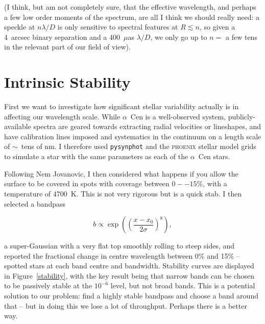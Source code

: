 \documentclass[a4paper,12pt]{article}
\begin{document}
(I think, but am not completely sure, that the effective wavelength, and perhaps a few low order moments of the spectrum, are all I think we should really need: a speckle at $n \lambda/D$ is only sensitive to spectral features at $R\lesssim n$, so given a 4~arcsec binary separation and a 400~$\mu$as $\lambda/D$, we only go up to $n =$ a few tens in the relevant part of our field of view).

\section{Intrinsic Stability}

First we want to investigate how significant stellar variability actually is in affecting our wavelength scale. While $\alpha$~Cen is a well-observed system, publicly-available spectra are geared towards extracting radial velocities or lineshapes, and have calibration lines imposed and systematics in the continuum on a length scale of $\sim$~tens of nm. I therefore used \texttt{pysynphot} and the \textsc{phoenix} stellar model grids to simulate a star with the same parameters as each of the $\alpha$~Cen stars.

Following Nem Jovanovic, I then considered what happens if you allow the surface to be covered in spots with coverage between $0 -- 15\%$, with a temperature of 4700~K. This is not very rigorous but is a quick stab. I then selected a bandpass 

\begin{equation}
b \propto \exp{ ((\dfrac{x-x_0}{2\sigma})^8)},
\end{equation}

a super-Gaussian with a very flat top smoothly rolling to steep sides, and reported the fractional change in centre wavelength between 0\% and 15\% -- spotted stars at each band centre and bandwidth. Stability curves are displayed in Figure~\ref{stability}, with the key result being that narrow bands can be chosen to be passively stable at the $10^{-6}$ level, but not broad bands. This is a potential solution to our problem: find a highly stable bandpass and choose a band around that -- but in doing this we lose a lot of throughput. Perhaps there is a better way.
\end{document}
